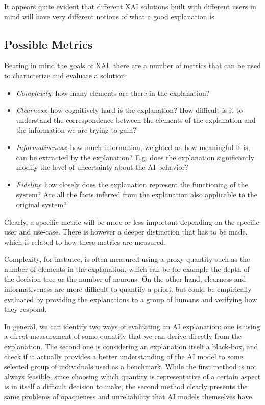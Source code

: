 \documentclass[conference]{IEEEtran}
\begin{document}
It appears quite evident that different XAI solutions built with different users
in mind will have very different notions of what a good explanation is.

\subsection{Possible Metrics}
\label{sec:dimensions}

Bearing in mind the goals of XAI, there are a number of metrics that can be used to characterize and evaluate a solution:

\begin{itemize}
    \item \textit{Complexity}: how many elements are there in the explanation?
    \item \textit{Clearness}: how cognitively hard is the explanation? How
          difficult is it to understand the correspondence between the elements
          of the explanation and the information we are trying to gain?
    \item \textit{Informativeness}: how much information, weighted on how
          meaningful it is, can be extracted by the explanation? E.g. does the
          explanation significantly modify the level of uncertainty about the AI
          behavior?
    \item \textit{Fidelity}: how closely does the explanation represent the
          functioning of the system? Are all the facts inferred from the
          explanation also applicable to the original system?
\end{itemize}

Clearly, a specific metric will be more or less important depending on the
specific user and use-case. There is however a deeper distinction that has to be
made, which is related to how these metrics are measured.

Complexity, for instance, is often measured using a proxy quantity such as
the number of elements in the explanation, which can be for example the depth of
the decision tree or the number of neurons. On the other hand, clearness and
informativeness are more difficult to quantify a-priori, but could be
empirically evaluated by providing the explanations to a group of humans and
verifying how they respond.

In general, we can identify two ways of evaluating an AI explanation: one is
using a direct measurement of some quantity that we can derive directly from the
explanation. The second one is considering an explanation itself a black-box,
and check if it actually provides a better understanding of the AI model to some
selected group of individuals used as a benchmark. While the first method is not
always feasible, since choosing which quantity is representative of a certain
aspect is in itself a difficult decision to make, the second method clearly
presents the same problems of opaqueness and unreliability that AI models
themselves have.
\end{document}
